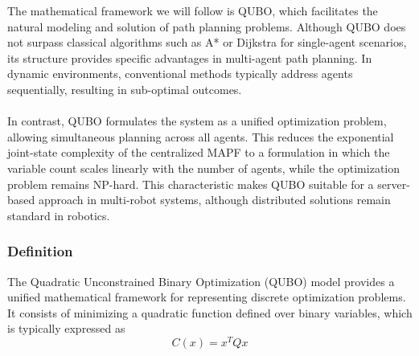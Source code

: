 \documentclass[11pt]{article}
\begin{document}
The mathematical framework we will follow is QUBO, which facilitates the natural modeling and solution of path planning problems. Although QUBO does not surpass classical algorithms such as A* or Dijkstra for single-agent scenarios, its structure provides specific advantages in multi-agent path planning. In dynamic environments, conventional methods typically address agents sequentially, resulting in sub-optimal outcomes.\\
\\
In contrast, QUBO formulates the system as a unified optimization problem, allowing simultaneous planning across all agents. This reduces the exponential joint-state complexity of the centralized MAPF to a formulation in which the variable count scales linearly with the number of agents, while the optimization problem remains NP-hard. This characteristic makes QUBO suitable for a server-based approach in multi-robot systems, although distributed solutions remain standard in robotics.

\subsubsection{Definition}

The Quadratic Unconstrained Binary Optimization (QUBO) model provides a unified mathematical framework for representing discrete optimization problems. It consists of minimizing a quadratic function defined over binary variables, which is typically expressed as
\begin{equation}
C(x)=x^TQx
\label{QUBO definition}
\end{equation}
\end{document}
